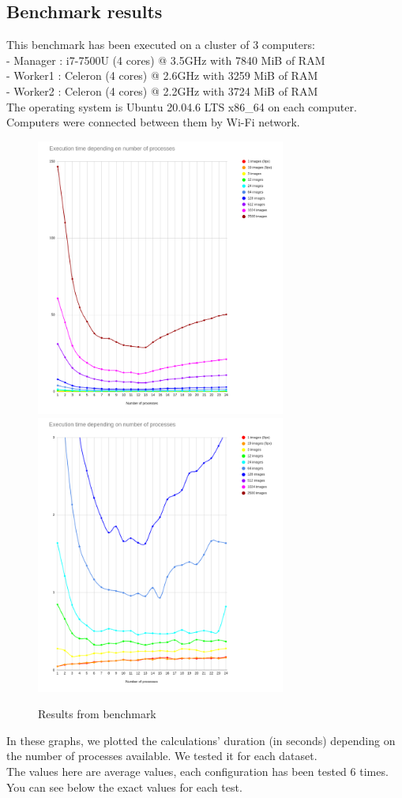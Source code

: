 \subsection{Benchmark results}
This benchmark has been executed on a cluster of 3 computers:\\
 - Manager : i7-7500U (4 cores) @ 3.5GHz with 7840 MiB of RAM\\
 - Worker1 : Celeron (4 cores) @ 2.6GHz with 3259 MiB of RAM\\
 - Worker2 : Celeron (4 cores) @ 2.2GHz with 3724 MiB of RAM\\
The operating system is Ubuntu 20.04.6 LTS x86\_64 on each computer. Computers were connected between them by Wi-Fi network.
\begin{figure}[H]
    \centering
    \includegraphics[width=8.2cm]{images/perfsAverage.png}
    \includegraphics[width=8.2cm]{images/perfsAverageZoomed.png}
    \caption{Results from benchmark}
    \label{fig:benchmarkResAverage}
\end{figure}
In these graphs, we plotted the calculations' duration (in seconds) depending on the number of processes available. We tested it for each dataset.\\
The values here are average values, each configuration has been tested 6 times.\\
You can see below the exact values for each test.

